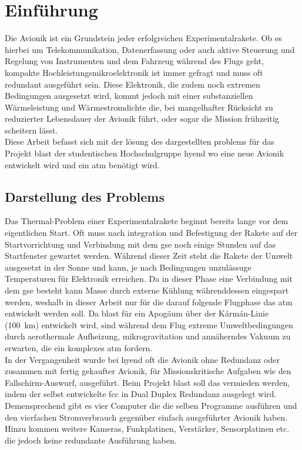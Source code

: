 \chapter{Einführung}			
\label{sec:Introduction}


Die Avionik ist ein Grundstein jeder erfolgreichen Experimentalrakete. Ob es hierbei um Telekommunikation,
Datenerfassung oder auch aktive Steuerung und Regelung von
Instrumenten und dem Fahrzeug während des Flugs geht, kompakte Hochleistungsmikroelektronik ist immer gefragt und muss oft redundant ausgeführt sein.
Diese Elektronik, die zudem noch extremen Bedingungen ausgesetzt wird, kommt jedoch mit einer
substanziellen Wärmeleistung und Wärmestromdichte die, bei mangelhafter Rücksicht zu reduzierter Lebensdauer der Avionik führt,
oder sogar die Mission frühzeitig scheitern lässt.\\

Diese Arbeit befasst sich mit der lösung des dargestellten problems für das Projekt \ac{blast} der studentischen Hochschulgruppe \ac{hyend}
wo eine neue Avionik entwickelt wird und ein \ac{atm} benötigt wird.

\section{Darstellung des Problems}

Das Thermal-Problem einer Experimentalrakete beginnt bereits lange vor dem eigentlichen Start. Oft muss nach integration und
Befestigung der Rakete auf der Startvorrichtung und Verbindung mit dem \ac{gse} noch einige Stunden auf das Startfenster gewartet werden.
Während dieser Zeit steht die Rakete der Umwelt ausgesetzt in der Sonne und kann, je nach Bedingungen 
unzulässuge Temperaturen für Elektronik erreichen. Da in dieser Phase eine Verbindung mit dem 
\ac{gse} besteht kann Masse durch externe Kühlung währenddessen eingespart werden, weshalb in dieser Arbeit nur für die darauf folgende 
Flugphase das \ac{atm} entwickelt werden soll.
Da \ac{blast} für ein Apogäum über der Kármán-Linie (\SI{100}{\kilo\meter}) entwickelt wird, sind während dem Flug extreme Umweltbedingungen
durch aerothermale Aufheizung, mikrogravitation und annäherndes Vakuum zu erwarten, die ein komplexes \ac{atm} fordern.\\

In der Vergangenheit wurde bei \ac{hyend} oft die Avionik ohne Redundanz oder zusammen mit fertig gekaufter Avionik, für 
Missionskritische Aufgaben wie den Fallschirm-Auswurf, ausgeführt. Beim Projekt \ac{blast} soll das vermieden werden, 
indem der selbst entwickelte \ac{fcc} in Dual Duplex Redundanz ausgelegt wird. Demensprechend gibt es vier Computer die
die selben Programme ausführen und den vierfachen Stromverbrauch gegenüber einfach ausgeführter Avionik haben. Hinzu kommen
weitere Kameras, Funkplatinen, Verstärker, Sensorplatinen etc. die jedoch keine redundante Ausführung haben.\\

